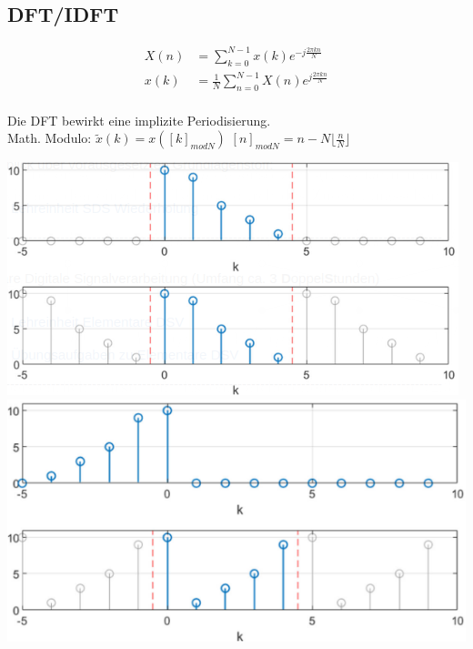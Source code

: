 \documentclass[10pt,a4paper]{article}
\begin{document}
  \subsection{DFT/IDFT}
  \begin{mdframed}[style=exercise]
    \begin{align}
        X(n)&=\sum_{k=0}^{N-1} x(k)e^{-j\frac{2\pi kn}{N}} \\
        x(k)&=\frac{1}{N}\sum_{n=0}^{N-1} X(n)e^{j\frac{2\pi kn}{N}} \\
    \end{align}
  \end{mdframed}
Die DFT bewirkt eine implizite Periodisierung. \\ 
Math. Modulo:
$\tilde{x}(k) = x([k]_{modN})$ 
$[n]_{modN}=n-N \lfloor \frac{n}{N} \rfloor$
  \begin{center}
      \includegraphics[width=.2\textwidth]{./img/x_k.png}
      \includegraphics[width=.2\textwidth]{./img/x_mk.png}
  \end{center}
\scriptsize
\end{document}
